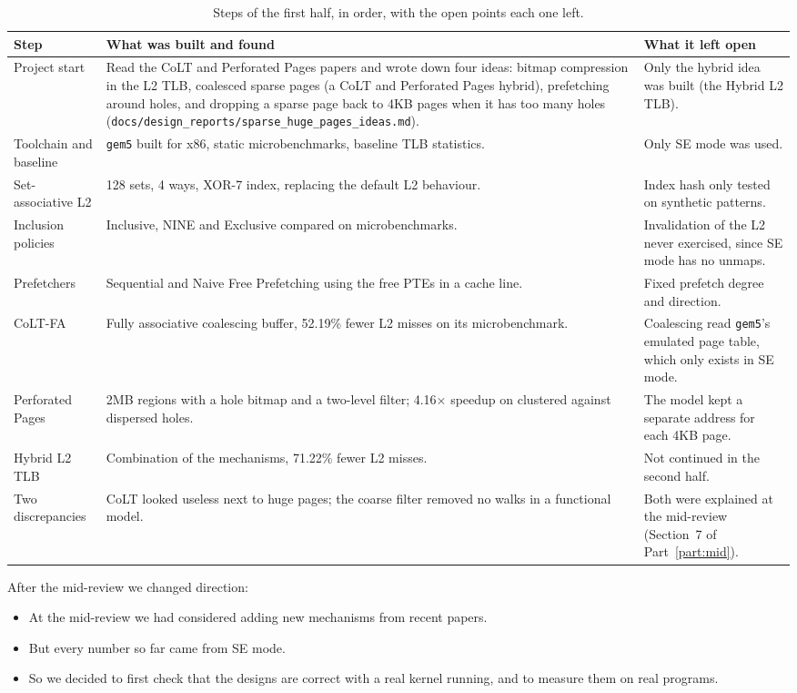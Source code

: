 \begin{table}[H]
\centering
\small
\caption{Steps of the first half, in order, with the open points each one left.}
\label{tab:chr_phase1}
\begin{tabularx}{\textwidth}{>{\raggedright\arraybackslash}p{3.2cm} X X}
\toprule
\textbf{Step} & \textbf{What was built and found} & \textbf{What it left open} \\
\midrule
Project start & Read the CoLT and Perforated Pages papers and wrote down four ideas: bitmap compression in the L2 TLB, coalesced sparse pages (a CoLT and Perforated Pages hybrid), prefetching around holes, and dropping a sparse page back to 4KB pages when it has too many holes (\texttt{docs/design\_reports/sparse\_huge\_pages\_ideas.md}). & Only the hybrid idea was built (the Hybrid L2 TLB). \\
Toolchain and baseline & \texttt{gem5} built for x86, static microbenchmarks, baseline TLB statistics. & Only SE mode was used. \\
Set-associative L2 & 128 sets, 4 ways, XOR-7 index, replacing the default L2 behaviour. & Index hash only tested on synthetic patterns. \\
Inclusion policies & Inclusive, NINE and Exclusive compared on microbenchmarks. & Invalidation of the L2 never exercised, since SE mode has no unmaps. \\
Prefetchers & Sequential and Naive Free Prefetching using the free PTEs in a cache line. & Fixed prefetch degree and direction. \\
CoLT-FA & Fully associative coalescing buffer, 52.19\% fewer L2 misses on its microbenchmark. & Coalescing read \texttt{gem5}'s emulated page table, which only exists in SE mode. \\
Perforated Pages & 2MB regions with a hole bitmap and a two-level filter; 4.16$\times$ speedup on clustered against dispersed holes. & The model kept a separate address for each 4KB page. \\
Hybrid L2 TLB & Combination of the mechanisms, 71.22\% fewer L2 misses. & Not continued in the second half. \\
Two discrepancies & CoLT looked useless next to huge pages; the coarse filter removed no walks in a functional model. & Both were explained at the mid-review (Section~7 of Part~\ref{part:mid}). \\
\bottomrule
\end{tabularx}
\end{table}

\noindent After the mid-review we changed direction:
\begin{itemize}
    \item At the mid-review we had considered adding new mechanisms from recent papers.
    \item But every number so far came from SE mode.
    \item So we decided to first check that the designs are correct with a real kernel running, and to measure them on real programs.
\end{itemize}


